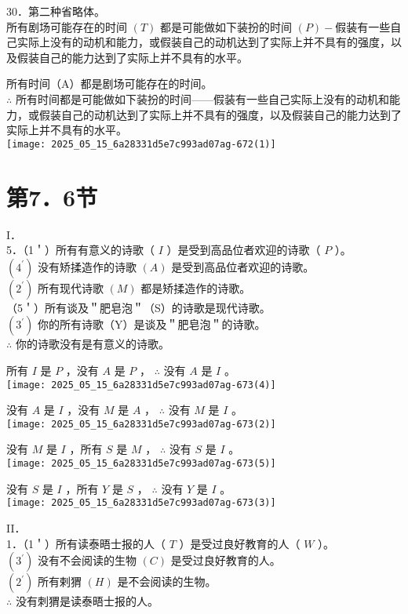 30．第二种省略体。\\
所有剧场可能存在的时间 $(T)$ 都是可能做如下装扮的时间 $(P)-$假装有一些自己实际上没有的动机和能力，或假装自己的动机达到了实际上并不具有的强度，以及假装自己的能力达到了实际上并不具有的水平。

所有时间（A）都是剧场可能存在的时间。\\
$\therefore$ 所有时间都是可能做如下装扮的时间——假装有一些自己实际上没有的动机和能力，或假装自己的动机达到了实际上并不具有的强度，以及假装自己的能力达到了实际上并不具有的水平。\\
\texttt{[image: 2025\_05\_15\_6a28331d5e7c993ad07ag-672(1)]}

\section*{第7．6节}
I．\\
5．（1＇）所有有意义的诗歌（ $I$ ）是受到高品位者欢迎的诗歌（ $P$ ）。\\
$\left(4^{\prime}\right)$ 没有矫揉造作的诗歌 $(A)$ 是受到高品位者欢迎的诗歌。\\
$\left(2^{\prime}\right)$ 所有现代诗歌 $(M)$ 都是矫揉造作的诗歌。\\
（5＇）所有谈及＂肥皂泡＂（S）的诗歌是现代诗歌。\\
$\left(3^{\prime}\right)$ 你的所有诗歌（Y）是谈及＂肥皂泡＂的诗歌。\\
$\therefore$ 你的诗歌没有是有意义的诗歌。

所有 $I$ 是 $P$ ，没有 $A$ 是 $P$ ， $\therefore$ 没有 $A$ 是 $I$ 。\\
\texttt{[image: 2025\_05\_15\_6a28331d5e7c993ad07ag-673(4)]}

没有 $A$ 是 $I$ ，没有 $M$ 是 $A$ ， $\therefore$ 没有 $M$ 是 $I$ 。\\
\texttt{[image: 2025\_05\_15\_6a28331d5e7c993ad07ag-673(2)]}

没有 $M$ 是 $I$ ，所有 $S$ 是 $M$ ， $\therefore$ 没有 $S$ 是 $I$ 。\\
\texttt{[image: 2025\_05\_15\_6a28331d5e7c993ad07ag-673(5)]}

没有 $S$ 是 $I$ ，所有 $Y$ 是 $S$ ， $\therefore$ 没有 $Y$ 是 $I$ 。\\
\texttt{[image: 2025\_05\_15\_6a28331d5e7c993ad07ag-673(3)]}

II．\\
1．（1＇）所有读泰晤士报的人（ $T$ ）是受过良好教育的人（ $W$ ）。\\
$\left(3^{\prime}\right)$ 没有不会阅读的生物 $(C)$ 是受过良好教育的人。\\
$\left(2^{\prime}\right)$ 所有剌猬 $(H)$ 是不会阅读的生物。\\
$\therefore$ 没有刺猬是读泰晤士报的人。

